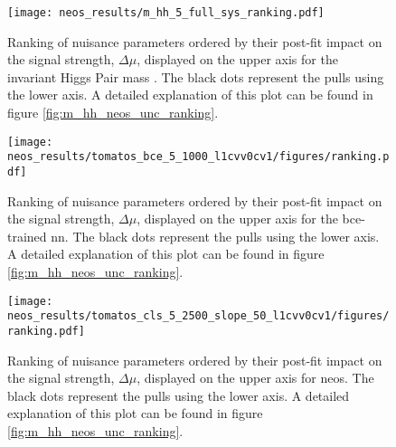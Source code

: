 \begin{figure}
    \centering
    \texttt{[image: neos\_results/m\_hh\_5\_full\_sys\_ranking.pdf]}
    \caption[]{Ranking of nuisance parameters ordered by their post-fit impact on the signal strength, $\Delta\mu$, displayed on the upper axis for the invariant Higgs Pair mass \mhh{}. The black dots represent the pulls using the lower axis. A detailed explanation of this plot can be found in figure \ref{fig:m_hh_neos_unc_ranking}.}
    \label{fig:m_hh_full_sys_ranking}
\end{figure}
\begin{figure}
    \centering
    \texttt{[image: neos\_results/tomatos\_bce\_5\_1000\_l1cvv0cv1/figures/ranking.pdf]}
    \caption[]{Ranking of nuisance parameters ordered by their post-fit impact on the signal strength, $\Delta\mu$, displayed on the upper axis for the \ac{bce}-trained \ac{nn}. The black dots represent the pulls using the lower axis. A detailed explanation of this plot can be found in figure \ref{fig:m_hh_neos_unc_ranking}.}
    \label{fig:bce_full_sys_ranking}
\end{figure}
\begin{figure}
    \centering
    \texttt{[image: neos\_results/tomatos\_cls\_5\_2500\_slope\_50\_l1cvv0cv1/figures/ranking.pdf]}
    \caption[]{Ranking of nuisance parameters ordered by their post-fit impact on the signal strength, $\Delta\mu$, displayed on the upper axis for \ac{neos}. The black dots represent the pulls using the lower axis. A detailed explanation of this plot can be found in figure \ref{fig:m_hh_neos_unc_ranking}.}
    \label{fig:neos_full_sys_ranking}
\end{figure}
